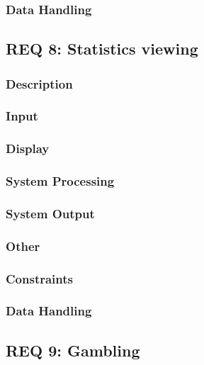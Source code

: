 \documentclass[a4paper, 11pt]{article} %
\begin{document}
\subsubsection{Data Handling}

\newpage

\subsection{REQ 8: Statistics viewing}

\subsubsection{Description}

\subsubsection{Input}

\subsubsection{Display}

\subsubsection{System Processing}

\subsubsection{System Output}

\subsubsection{Other}

\subsubsection{Constraints}

\subsubsection{Data Handling}

\newpage

\subsection{REQ 9: Gambling}
\end{document}
